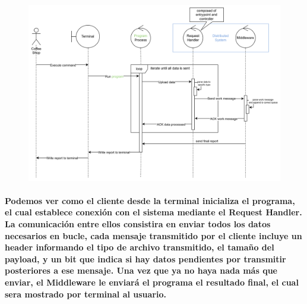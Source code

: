 \documentclass[titlepage,a4paper]{article}
\begin{document}
\begin{figure}[H]
    \centering
    \includegraphics[width=1\linewidth]{secuencia.png}
\end{figure}
\paragraph{Podemos ver como el cliente desde la terminal inicializa el programa, el cual establece conexión con el sistema mediante el Request Handler. La comunicación entre ellos consistira en enviar todos los datos necesarios en bucle, cada mensaje transmitido por el cliente incluye un header informando el tipo de archivo transmitido, el tamaño del payload, y un bit que indica si hay datos pendientes por transmitir posteriores a ese mensaje. Una vez que ya no haya nada más que enviar, el Middleware le enviará el programa el resultado final, el cual sera mostrado por terminal al usuario.}
\end{document}

